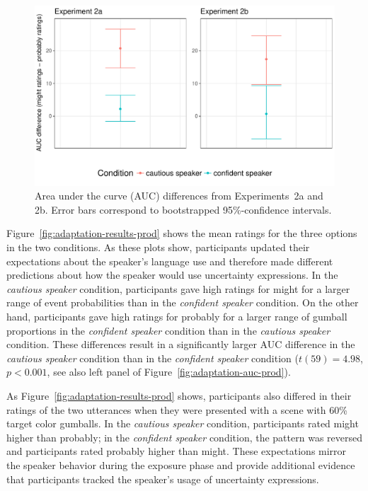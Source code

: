 \documentclass[man, floatsintext]{apa6}
\begin{document}
\begin{figure}
\center
\includegraphics[width=.75\textwidth]{plots/exp-1-aucs.pdf}
\caption{Area under the curve (AUC) differences from Experiments~2a and 2b. Error bars correspond to bootstrapped 95\%-confidence intervals.  \label{fig:adaptation-auc-prod-orig}}
\end{figure}

Figure~\ref{fig:adaptation-results-prod} shows the mean ratings for the three options in the two conditions. As these plots show, participants updated their expectations about the speaker's language use and therefore made different predictions about how the speaker would use uncertainty expressions. In the \emph{cautious speaker} condition, participants gave high ratings for {\sc might} for a larger range of event probabilities than in the \emph{confident speaker} condition. On the other hand, participants gave high ratings for {\sc probably} for a larger range of gumball proportions in the \emph{confident speaker} condition than in the \emph{cautious speaker} condition. These differences result in a significantly larger AUC difference in the \emph{cautious speaker} condition than in the \emph{confident speaker} condition ($t(59) = 4.98$, $p < 0.001$, see also left panel of Figure~\ref{fig:adaptation-auc-prod}).

As Figure~\ref{fig:adaptation-results-prod} shows, participants also differed in their ratings of the two utterances when they were presented with a scene with 60\% target color gumballs. In the \emph{cautious speaker} condition, participants rated {\sc might} higher than {\sc probably}; in the \emph{confident speaker} condition, the pattern was reversed and participants rated {\sc probably} higher than {\sc might}. These expectations mirror the speaker behavior during the exposure phase and provide additional evidence that participants tracked the speaker's usage of uncertainty expressions. 
\end{document}
